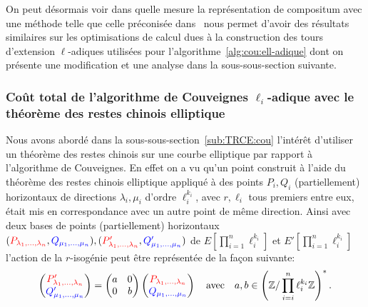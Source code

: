 \documentclass[10pt,a4paper]{book}
\theoremstyle{plain}
\theoremstyle{definition}
\theoremstyle{definition}
\theoremstyle{definition}
\theoremstyle{definition}
\theoremstyle{remark}
\theoremstyle{remark}
\theoremstyle{definition}
\begin{document}
 On peut désormais voir dans quelle mesure la représentation
 de compositum avec une méthode telle que celle préconisée 
 dans~\cite{DeFeoDoliskaniSchost14} nous permet d'avoir des résultats 
 similaires sur les optimisations de calcul dues à la construction des tours 
 d'extension $\ell$-adiques utilisées pour 
 l'algorithme~\ref{alg:cou:ell-adique} dont on présente une modification et une
 analyse dans la sous-sous-section suivante. 


\subsubsection{Coût total de l'algorithme de Couveignes $\ell_i$-adique avec le théorème des restes chinois elliptique}
Nous avons abordé dans la sous-sous-section~\ref{sub:TRCE:cou} l'intérêt 
d'utiliser un théorème des restes chinois sur une courbe elliptique par rapport
à l'algorithme de Couveignes. En effet on a vu qu'un point construit à l'aide 
du théorème des restes chinois elliptique appliqué à des points $P_i,Q_i$ 
(partiellement) horizontaux de directions $\lambda_i,\mu_i$  d'ordre 
$\ell_i^{k_i}$, avec $r, \ell_i$ tous premiers entre eux, 
était mis en correspondance avec un autre point de même direction.
Ainsi avec deux bases de points (partiellement) horizontaux $(\color{red}P_{\lambda_1,
 \dots, \lambda_n}\color{black},\color{blue}Q_{\mu_1, \dots, 
 \mu_n}\color{black}),(\color{red}P'_{\lambda_1, \dots, \lambda_n}\color{black}
 ,\color{blue}
 Q'_{\mu_1, \dots, \mu_n}\color{black})$ de $E[\prod_{i=1}^n\ell_i^{k_i}]$ et 
 $E'[\prod_{i=1}^n\ell_i^{k_i}]$ l'action de la $r$-isogénie peut être 
 représentée de la façon suivante:  
 \begin{equation*}
\left(
\begin{matrix}
\color{red} P'_{\lambda_1,
 \dots, \lambda_n} \\
\color{blue} Q'_{\mu_1, \dots, 
 \mu_n} \color{black}
\end{matrix}
\right)= \left(\begin{matrix}
a & 0 \\
0 & b
\end{matrix} \right)
\left(
\begin{matrix}
\color{red} P_{\lambda_1, 
\dots, \lambda_n} \\
\color{blue} Q_{\mu_1, \dots, 
 \mu_n} \color{black}
\end{matrix}
\right)
\quad \text{avec} \quad a,b \in \left( \mathbb{Z}/\prod_{i=i}^n\ell_i^{k_i}\mathbb{Z} \right)^*.
\end{equation*}
 
\end{document}
